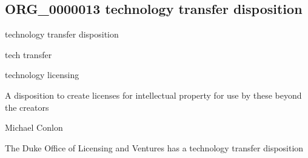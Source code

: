 \documentclass[letterpaper,10pt,english]{sphinxmanual}
\begin{document}
\subsection{ORG\_0000013 \sphinxhyphen{} technology transfer disposition}
\label{\detokenize{doc-ORG_0000013:org-0000013-technology-transfer-disposition}}\label{\detokenize{doc-ORG_0000013:index-0}}\label{\detokenize{doc-ORG_0000013::doc}}
\begin{sphinxShadowBox}

\sphinxAtStartPar
technology transfer disposition
\end{sphinxShadowBox}

\begin{sphinxShadowBox}

\sphinxAtStartPar
tech transfer

\sphinxAtStartPar
technology licensing
\end{sphinxShadowBox}

\begin{sphinxShadowBox}

\sphinxAtStartPar
{\hyperref[\detokenize{doc-BFO_0000016::doc}]{}}
\end{sphinxShadowBox}

\begin{sphinxShadowBox}

\sphinxAtStartPar
A disposition to create licenses for intellectual property for use by these beyond the creators
\end{sphinxShadowBox}

\begin{sphinxShadowBox}

\sphinxAtStartPar
Michael Conlon 
\end{sphinxShadowBox}

\begin{sphinxShadowBox}

\sphinxAtStartPar
The Duke Office of Licensing and Ventures has a technology transfer disposition
\end{sphinxShadowBox}

\begin{sphinxShadowBox}

\sphinxAtStartPar
{}
\end{sphinxShadowBox}
\end{document}
